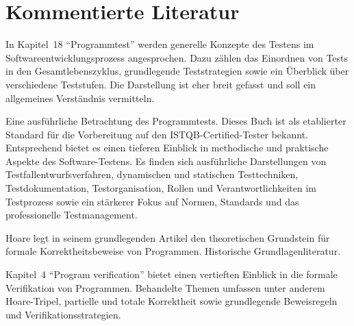 \section{Kommentierte Literatur}
\label{sec:Kap-11.3}

{In Kapitel~18 "`Programmtest"' werden generelle Konzepte des Testens im Software\-entwicklungs\-prozess angesprochen. Dazu zählen das Einordnen von Tests in den Gesamtlebenszyklus, grundlegende Teststrategien sowie ein Überblick über verschiedene Teststufen. Die Darstellung ist eher breit gefasst und soll ein allgemeines Verständnis vermitteln.}

{Eine ausführliche Betrachtung des Programmtests. Dieses Buch ist als etablierter Standard für die Vorbereitung auf den ISTQB-Certified-Tester bekannt. Ent\-sprechend bietet es einen tieferen Einblick in methodische und praktische Aspekte des Software-Testens. Es finden sich ausführliche Darstellungen von Testfallentwurfsverfahren, dynamischen und statischen Testtechniken, Testdokumentation, Test\-organisation, Rollen und Verantwortlichkeiten im Testprozess sowie ein stärkerer Fokus auf Normen, Standards und das professionelle Testmanagement.}

{Hoare legt in seinem grundlegenden Artikel den theoretischen Grundstein für formale Korrektheitsbeweise von Programmen. Historische Grundlagenliteratur.}

{Kapitel~4 "`Program verification"' bietet einen vertieften Einblick in die formale Verifikation von Programmen. Behandelte Themen umfassen unter anderem Hoare-Tripel, partielle und totale Korrektheit sowie grundlegende Beweisregeln und Verifikations\-strategien.}